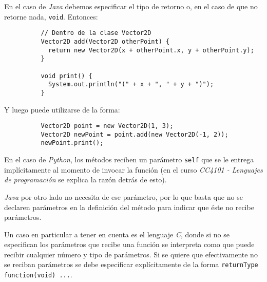       En el caso de \textit{Java} debemos especificar el tipo de retorno o, en el caso de 
      que no retorne nada, \texttt{void}.
      Entonces:

      \begin{listing}[ht!]
        \begin{verbatim}
          // Dentro de la clase Vector2D
          Vector2D add(Vector2D otherPoint) {
            return new Vector2D(x + otherPoint.x, y + otherPoint.y);
          }

          void print() {
            System.out.println("(" + x + ", " + y + ")");
          }
        \end{verbatim}
      \end{listing}

      Y luego puede utilizarse de la forma:

      \begin{listing}[ht!]
        \begin{verbatim}
          Vector2D point = new Vector2D(1, 3);
          Vector2D newPoint = point.add(new Vector2D(-1, 2));
          newPoint.print();
        \end{verbatim}
      \end{listing}

      \begin{note}
        En el caso de \textit{Python}, los métodos reciben un parámetro 
        \texttt{self} que se le entrega implícitamente al momento de invocar 
        la función (en el curso \textit{CC4101 - Lenguajes de programación} se explica la 
        razón detrás de esto).

        \textit{Java} por otro lado no necesita de ese parámetro, por lo que basta que no
        se declaren parámetros en la definición del método para indicar que éste no recibe
        parámetros.
        
        Un caso en particular a tener en cuenta es el lenguaje \textit{C}, donde si no se 
        especifican los parámetros que recibe una función se interpreta como que puede 
        recibir cualquier número y tipo de parámetros.
        Si se quiere que efectivamente no se reciban parámetros se debe especificar 
        explícitamente de la forma \texttt{returnType function(void) {...}}.
      \end{note}

